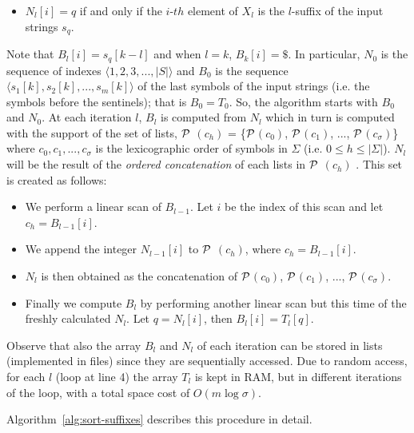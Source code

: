 \documentclass[a4paper,12pt, oneside]{article}
\begin{document}
\begin{itemize}
	\item $N_l[i] = q$ if and only if the $i$-$th$ element of $X_l$ is the $l$-suffix of the input strings $s_q$.
\end{itemize} 

Note that $B_l[i] = s_q[k-l]$ and when $l = k$, $B_k[i] = \$$. In particular, $N_0$ is the sequence of indexes $\langle 1,2,3,...,|S|\rangle$ and $B_0$ is the sequence $\langle s_1[k], s_2[k],...,s_m[k]\rangle$ of the last symbols of the input strings (i.e. the symbols before the sentinels); that is $B_0 = T_0$. 
So, the algorithm starts with $B_0$ and $N_0$. At each iteration $l$, $B_l$ is computed from $N_l$ which in turn is computed with the support of the set of lists, $\cal P$ $(c_h)$ = \{$\cal P$$(c_0)$, $\cal P$$(c_1)$, ..., $\cal P$$(c_\sigma)$\} where $c_0, c_1, ..., c_\sigma$ is the lexicographic order of symbols in $\Sigma$ (i.e. $0 \leq h \leq |\Sigma|$). $N_l$ will be the result of the \textit{ordered concatenation} of each lists in $\cal P$ $(c_h)$ . This set is created as follows:

\begin{itemize}
	\item We perform a linear scan of $B_{l-1}$. Let $i$ be the index of this scan and let $c_h = B_{l-1}[i]$.
	\item We append the integer $N_{l-1}[i]$ to $\cal P$ $(c_h)$, where $c_h = B_{l-1}[i]$.
	\item $N_l$ is then obtained as the concatenation of $\cal P$$(c_0)$, $\cal P$$(c_1)$, ..., $\cal P$$(c_\sigma)$.
	\item Finally we compute $B_l$ by performing another linear scan but this time of the freshly calculated $N_l$. Let $q = N_l[i]$, then $B_l[i] = T_l[q]$.
\end{itemize}


Observe that also the array $B_l$ and $N_l$ of each iteration can be stored in lists (implemented in files) since they are sequentially accessed. Due to random access, for each $l$ (loop at line 4) the array $T_l$ is kept in RAM, but in different iterations of the loop, with a total space cost of $O(m \log \sigma)$. 

Algorithm~\ref{alg:sort-suffixes} describes this procedure in detail.
\end{document}

